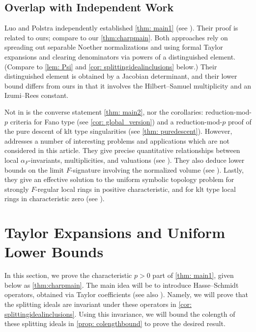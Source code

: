 \documentclass[11pt,leqno]{amsart}
\numberwithin{equation}{section}
\theoremstyle{definition}
\theoremstyle{remark}
\begin{document}
\subsection*{Overlap with Independent Work} Luo and Polstra \cite{LuoPolstra26} independently established \cref{thm: main1} (see \cite[Main Theorem 2]{LuoPolstra26}). Their proof is related to ours; compare \cite[Main Theorem 1]{LuoPolstra26} to our \cref{thm:charpmain}. Both approaches rely on spreading out separable Noether normalizations and using formal Taylor expansions and clearing denominators via powers of a distinguished element. (Compare \cite[Lemma 3.1 and Corollary 3.2]{LuoPolstra26} to \cref{lem: Psi} and \cref{cor: splittingidealinclusions} below.) Their distinguished element is obtained by a Jacobian determinant, and their lower bound differs from ours in that it involves the Hilbert--Samuel multiplicity and an Izumi--Rees constant. 

Not in \cite{LuoPolstra26} is the converse statement \cref{thm: main2}, nor the corollaries: reduction-mod-$p$ criteria for Fano type (see \cref{cor: global_version}) and a reduction-mod-$p$ proof of the pure descent of klt type singularities (see \cref{thm: puredescent}). However, \cite{LuoPolstra26} addresses a number of interesting problems and applications which are not considered in this article. They give precise quantitative relationships between local $\alpha_F$-invariants, multiplicities, and valuations (see \cite[Main Theorems 1 and 4]{LuoPolstra26}). They also deduce lower bounds on the limit $F$-signature involving the normalized volume (see \cite[Main Theorem 3]{LuoPolstra26}). Lastly, they give an effective solution to the uniform symbolic topology problem for strongly $F$-regular local rings in positive characteristic, and for klt type local rings in characteristic zero (see \cite[Main Theorem 4]{LuoPolstra26}).



\section{Taylor Expansions and Uniform Lower Bounds}

In this section, we prove the characteristic $p > 0$ part of \cref{thm: main1}, given below as \cref{thm:charpmain}. The main idea will be to introduce Hasse--Schmidt operators, obtained via Taylor coefficients (see also \cite[16.11.1--16.11.2]{EGAIV}). Namely, we will prove that the splitting ideals are invariant under these operators in \cref{cor: splittingidealinclusions}. Using this invariance, we will bound the colength of these splitting ideals in \cref{prop: colengthbound} to prove the desired result. 
\end{document}
